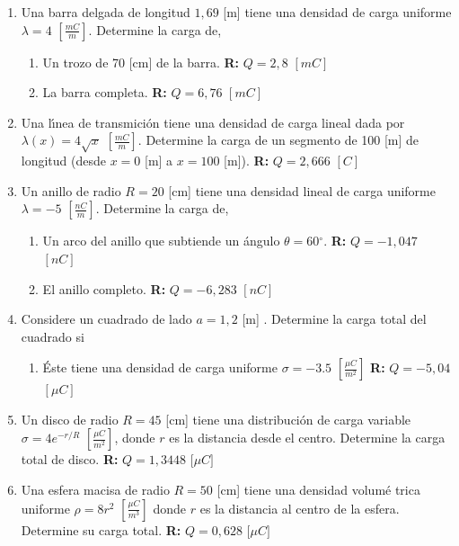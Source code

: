 \documentclass[12pt]{article}
\begin{document}
\begin{enumerate}
\item Una barra delgada de longitud $1,69$ [m] tiene una densidad de carga
uniforme $\lambda =4$ $\left[ \frac{mC}{m}\right] $. Determine la carga de,

\begin{enumerate}
\item Un trozo de 70 [cm] de la barra. \textbf{R: }$Q=2,8$ $[mC]$

\item La barra completa. \textbf{R:} $Q=6,76$ $[mC]$
\end{enumerate}

\item Una l\'{\i}nea de transmici\'{o}n tiene una densidad de carga lineal
dada por $\lambda (x)=4\sqrt{x}$ $\left[ \frac{mC}{m}\right] .$ Determine la
carga de un segmento de 100 [m] de longitud (desde $x=0$ [m] a $x=100$ [m]). 
\textbf{R: }$Q=2,666$ $[C]$

\item Un anillo de radio $R=20$ [cm] tiene una densidad lineal de carga
uniforme $\lambda =-5$ $\left[ \frac{nC}{m}\right] .$ Determine la carga de,

\begin{enumerate}
\item Un arco del anillo que subtiende un \'{a}ngulo $\theta =60%
{{}^\circ}%
.$ \textbf{R: }$Q=-1,047$ $[nC]$

\item El anillo completo. \textbf{R: }$Q=-6,283$ $[nC]$
\end{enumerate}

\item Considere un cuadrado de lado $a=1,2$ [m] . Determine la carga total
del cuadrado si

\begin{enumerate}
\item \'{E}ste tiene una densidad de carga uniforme $\sigma =-3.5$ $\left[ 
\frac{\mu C}{m^{2}}\right] $ \textbf{R: }$Q=-5,04$ $[\mu C]$
\end{enumerate}

\item Un disco de radio $R=45$ [cm] tiene una distribuci\'{o}n de carga
variable $\sigma =4e^{-r/R}$ $\left[ \frac{\mu C}{m^{2}}\right] $, donde $r$
es la distancia desde el centro. Determine la carga total de disco. \textbf{%
R:} $Q=1,3448$ [$\mu C]$

\item Una esfera macisa de radio $R=50$ [cm] tiene una densidad volum\'{e}%
trica uniforme $\rho =8r^{2}$ $\left[ \frac{\mu C}{m^{3}}\right] $ donde $r$
es la distancia al centro de la esfera. Determine su carga total. \textbf{R:}
$Q=0,628$ [$\mu C]$
\end{enumerate}
\end{document}

